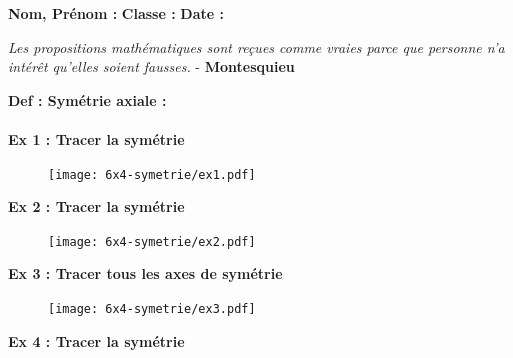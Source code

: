 



\textbf{Nom, Prénom :} \hspace{8cm} \textbf{Classe :} \hspace{3cm} \textbf{Date :}\\

\begin{center}
  \textit{Les propositions mathématiques sont reçues comme vraies parce que personne n’a intérêt qu’elles soient fausses.} - \textbf{Montesquieu}
\end{center}

\textbf{Def : Symétrie axiale : } \dotfill \\ \Pointilles[2] \\

\textbf{Ex 1 : Tracer la symétrie}

\begin{figure}[H]
  \centering
  \texttt{[image: 6x4-symetrie/ex1.pdf]}
\end{figure}

\begin{multicols}{2} 
\textbf{Ex 2 : Tracer la symétrie}

\begin{figure}[H]
  \centering
  \texttt{[image: 6x4-symetrie/ex2.pdf]}
\end{figure}

\textbf{Ex 3 : Tracer tous les axes de symétrie}

\begin{figure}[H]
  \centering
  \texttt{[image: 6x4-symetrie/ex3.pdf]}
\end{figure}
\end{multicols}

\textbf{Ex 4 : Tracer la symétrie}

